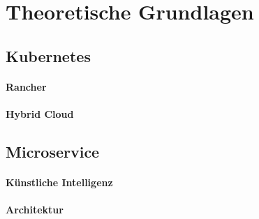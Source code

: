\chapter{Theoretische Grundlagen}
\section{Kubernetes}
\subsubsection{Rancher}
\subsubsection{Hybrid Cloud}
\section{Microservice}
\subsubsection{Künstliche Intelligenz}
\subsubsection{Architektur}
